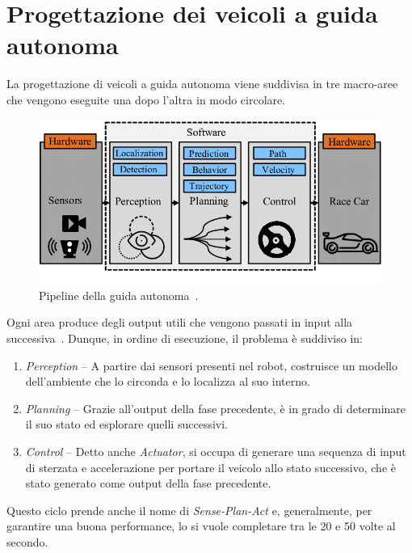 \section{Progettazione dei veicoli a guida autonoma}
La progettazione di veicoli a guida autonoma viene suddivisa in tre macro-aree che
vengono eseguite una dopo l’altra in modo circolare.

\begin{figure}[h]
    \centering
    \includegraphics[width=\textwidth]{images/adv_stack.png}
    \caption{Pipeline della guida autonoma~\cite{Betz2022}.}
    \label{fig:fig4} %
\end{figure}

Ogni area produce degli output utili che vengono passati in input alla 
successiva~\cite{Betz2022}. Dunque, in ordine di esecuzione, il problema è suddiviso in:
\begin{enumerate}
    \item \textit{Perception} -- A partire dai sensori presenti nel robot, costruisce
    un modello dell'ambiente che lo circonda e lo localizza al suo interno.
    \item \textit{Planning} -- Grazie all'output della fase precedente, è in grado
    di determinare il suo stato ed esplorare quelli successivi.
    \item \textit{Control} -- Detto anche \textit{Actuator}, si occupa di generare una 
    sequenza di {input} di sterzata e accelerazione per portare il veicolo allo stato 
    successivo, che è stato generato come output della fase precedente.
\end{enumerate}

Questo ciclo prende anche il nome di \textit{Sense-Plan-Act} e, generalmente, per
garantire una buona performance, lo si vuole completare tra le 20 e 50 volte al secondo.

